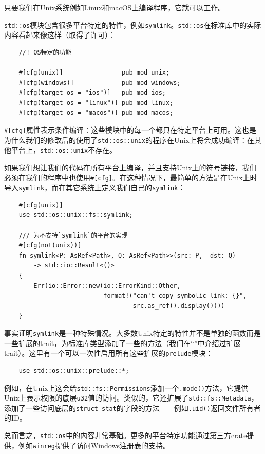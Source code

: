 只要我们在Unix系统例如Linux和macOS上编译程序，它就可以工作。

\texttt{std::os}模块包含很多平台特定的特性，例如\texttt{symlink}。\texttt{std::os}在标准库中的实际内容看起来像这样（取得了许可）：
\begin{verbatim}
    //! OS特定的功能

    #[cfg(unix)]                pub mod unix;
    #[cfg(windows)]             pub mod windows;
    #[cfg(target_os = "ios")]   pub mod ios;
    #[cfg(target_os = "linux")] pub mod linux;
    #[cfg(target_os = "macos")] pub mod macos;
\end{verbatim}

\texttt{\#[cfg]}属性表示条件编译：这些模块中的每一个都只在特定平台上可用。这也是为什么我们的修改后的使用了\texttt{std::os::unix}的程序在Unix上将会成功编译：在其他平台上，\texttt{std::os::unix}不存在。

如果我们想让我们的代码在所有平台上编译，并且支持Unix上的符号链接，我们必须在我们的程序中也使用\texttt{\#[cfg]}。在这种情况下，最简单的方法是在Unix上时导入\texttt{symlink}，而在其它系统上定义我们自己的\texttt{symlink}：
\begin{verbatim}
    #[cfg(unix)]
    use std::os::unix::fs::symlink;

    /// 为不支持`symlink`的平台的实现
    #[cfg(not(unix))]
    fn symlink<P: AsRef<Path>, Q: AsRef<Path>>(src: P, _dst: Q)
        -> std::io::Result<()>
    {
        Err(io::Error::new(io::ErrorKind::Other,
                           format!("can't copy symbolic link: {}", 
                                   src.as_ref().display())))
    }
\end{verbatim}

事实证明\texttt{symlink}是一种特殊情况。大多数Unix特定的特性并不是单独的函数而是一些扩展的trait，为标准库类型添加了一些的方法（我们在“”中介绍过扩展trait）。这里有一个可以一次性启用所有这些扩展的\texttt{prelude}模块：
\begin{verbatim}
    use std::os::unix::prelude::*;
\end{verbatim}

例如，在Unix上这会给\texttt{std::fs::Permissions}添加一个\texttt{.mode()}方法，它提供Unix上表示权限的底层\texttt{u32}值的访问。类似的，它还扩展了\texttt{std::fs::Metadata}，添加了一些访问底层的\texttt{struct stat}的字段的方法——例如\texttt{.uid()}返回文件所有者的ID。

总而言之，\texttt{std::os}中的内容非常基础。更多的平台特定功能通过第三方crate提供，例如\href{https://crates.io/crates/winreg}{\texttt{winreg}}提供了访问Windows注册表的支持。

